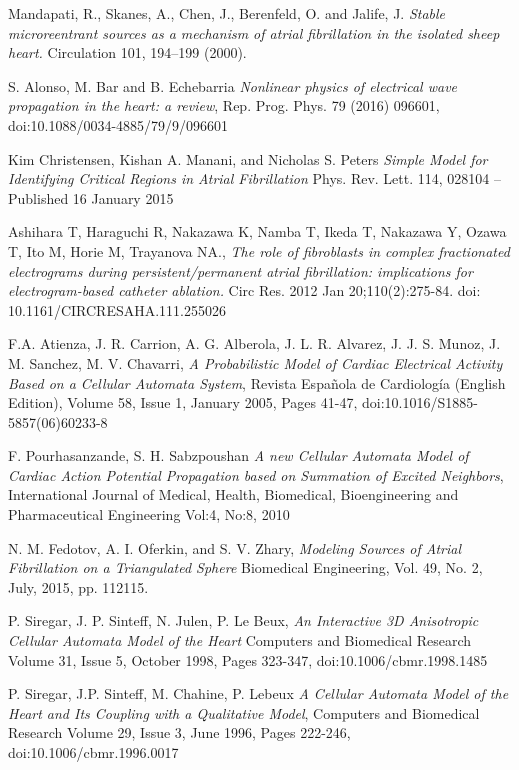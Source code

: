 \documentclass[twocolumn, a1paper]{article}
\begin{document}
\begin{thebibliography}{7}
Mandapati, R., Skanes, A., Chen, J., Berenfeld, O. and  Jalife, J. 
\emph{Stable microreentrant sources as a mechanism of atrial fibrillation in the isolated sheep heart.}
Circulation 101, 194–199 (2000). 

S. Alonso, M. Bar and B. Echebarria
\emph{Nonlinear physics of electrical wave
propagation in the heart: a review},
Rep. Prog. Phys. 79 (2016) 096601, 
doi:10.1088/0034-4885/79/9/096601

Kim Christensen, Kishan A. Manani, and Nicholas S. Peters
\emph{Simple Model for Identifying Critical Regions in Atrial Fibrillation}
Phys. Rev. Lett. 114, 028104 – Published 16 January 2015

Ashihara T, Haraguchi R, Nakazawa K, Namba T, Ikeda T, Nakazawa Y, Ozawa T, Ito M, Horie M, Trayanova NA., 
\emph{The role of fibroblasts in complex fractionated electrograms during persistent/permanent atrial fibrillation: implications for electrogram-based catheter ablation.}
Circ Res. 2012 Jan 20;110(2):275-84. doi: 10.1161/CIRCRESAHA.111.255026

F.A. Atienza, J. R. Carrion, A. G. Alberola, J. L. R. Alvarez, J. J. S. Munoz, J. M. Sanchez, M. V. Chavarri,
\emph{A Probabilistic Model of Cardiac Electrical Activity Based on a Cellular Automata System},
Revista Española de Cardiología (English Edition), Volume 58, Issue 1, January 2005, Pages 41-47,
doi:10.1016/S1885-5857(06)60233-8

F. Pourhasanzande, S. H. Sabzpoushan
\emph{A new Cellular Automata Model of Cardiac
Action Potential Propagation based on
Summation of Excited Neighbors}, 
International Journal of Medical, Health, Biomedical, Bioengineering and Pharmaceutical Engineering Vol:4, No:8, 2010  

N. M. Fedotov,  A. I. Oferkin, and S. V. Zhary,
\emph{Modeling Sources of Atrial Fibrillation on a Triangulated Sphere}
Biomedical Engineering, Vol. 49, No. 2, July, 2015, pp. 112115. 

P. Siregar, J. P. Sinteff, N. Julen, P. Le Beux,
\emph{An Interactive 3D Anisotropic Cellular Automata Model of the Heart}
Computers and Biomedical Research
Volume 31, Issue 5, October 1998, Pages 323-347, 
doi:10.1006/cbmr.1998.1485

P. Siregar, J.P. Sinteff, M. Chahine, P. Lebeux
\emph{A Cellular Automata Model of the Heart and Its Coupling with a Qualitative Model}, 
Computers and Biomedical Research
Volume 29, Issue 3, June 1996, Pages 222-246,
doi:10.1006/cbmr.1996.0017


\end{thebibliography}
\end{document}
